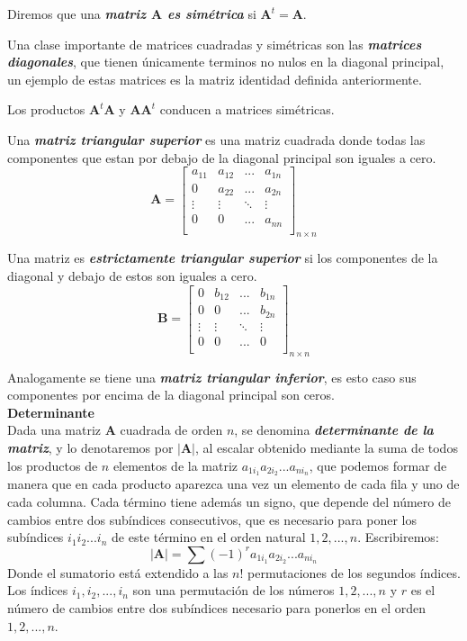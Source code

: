 \documentclass[12pt,letterpaper]{report} %
\begin{document}
Diremos que una \textit{\textbf{matriz $\mathbf{A}$ es simétrica}} si $\mathbf{A}^t=\mathbf{A}$.

Una clase importante de matrices cuadradas y simétricas son las \textit{\textbf{matrices diagonales}}, que tienen únicamente terminos no nulos en la diagonal principal, un ejemplo de estas matrices es la matriz identidad definida anteriormente.

Los productos $\mathbf{A}^t\mathbf{A}$ y $\mathbf{A}\mathbf{A}^t$ conducen a matrices simétricas.

Una \textit{\textbf{matriz triangular superior}} es una matriz cuadrada donde todas las componentes que estan por debajo de la diagonal principal son iguales a cero. 
$$
\mathbf{A}=
\begin{bmatrix}
a_{11} & a_{12} & ... & a_{1n} \\
0 & a_{22} & ... & a_{2n} \\
\vdots & \vdots & \ddots & \vdots \\
0 & 0 & ... & a_{nn} \\
\end{bmatrix}_{n\times n}
$$

Una matriz es \textit{\textbf{estrictamente triangular superior}} si los componentes de la diagonal y debajo de estos son iguales a cero.
$$
\mathbf{B}=
\begin{bmatrix}
0 & b_{12} & ... & b_{1n} \\
0 & 0 & ... & b_{2n} \\
\vdots & \vdots & \ddots & \vdots \\
0 & 0 & ... & 0 \\
\end{bmatrix}_{n\times n}
$$

Analogamente se tiene una \textit{\textbf{matriz triangular inferior}}, es esto caso sus componentes por encima de la diagonal principal son ceros.
\\

\textbf{Determinante}
\\

Dada una matriz $\mathbf{A}$ cuadrada de orden $n$, se denomina \textit{\textbf{determinante de la matriz}}, y lo denotaremos por $|\mathbf{A}|$, al escalar obtenido mediante la suma de todos los productos de $n$ elementos de la matriz $a_{1i_1}a_{2i_2}...a_{ni_n}$, que podemos formar de manera que en cada producto aparezca una vez un elemento de cada fila y uno de cada columna. Cada término tiene además un signo, que depende del número de cambios entre dos subíndices consecutivos, que es necesario para poner los subíndices $i_1 i_2 ... i_n$ de este término en el orden natural $1,2,...,n$. Escribiremos:
$$|\mathbf{A}|=\sum (-1)^r a_{1i_1}a_{2i_2}...a_{ni_n}$$
Donde el sumatorio está extendido a las $n!$ permutaciones de los segundos índices. Los índices $i_1,i_2,...,i_n$ son una permutación de los números $1,2,...,n$ y $r$ es el número de cambios entre dos subíndices necesario para ponerlos en el orden $1,2,...,n$.
\end{document}
